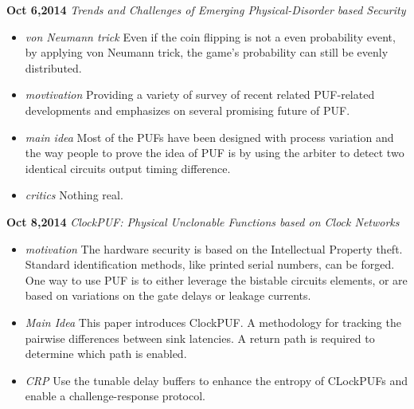 \documentclass[]{article}
\begin{document}
\noindent \textbf{Oct 6,2014}
\textit{Trends and Challenges of Emerging Physical-Disorder based Security}
\indent		\begin{itemize}
            \item \textit{von Neumann trick} Even if the coin flipping is not a even probability 
            event, by applying von Neumann trick, the game's probability can still be evenly 
            distributed.

            \item \textit{movtivation} Providing a variety of survey of recent related PUF-related
            developments and emphasizes on several promising future of PUF.

            \item \textit{main idea} Most of the PUFs have been designed with process variation and
            the way people to prove the idea of PUF is by using the arbiter to detect two identical
            circuits output timing difference.

            \item \textit{critics} Nothing real.

            \end{itemize}

\noindent \textbf{Oct 8,2014}
\textit{ClockPUF: Physical Unclonable Functions based on Clock Networks}
\indent		\begin{itemize}
                \item \textit{motivation} The hardware security is based on the Intellectual Property
                theft. Standard identification methods, like printed serial numbers, can be forged.
                One way to use PUF is to either leverage the bistable circuits elements, or are based
                on variations on the gate delays or leakage currents.

                \item \textit{Main Idea} This paper introduces ClockPUF. A methodology for tracking the 
                pairwise differences between sink latencies. A return path is required to determine which
                path is enabled.

                \item \textit{CRP} Use the tunable delay buffers to enhance the entropy of CLockPUFs and
                enable a challenge-response protocol.
            \end{itemize}
\end{document}
